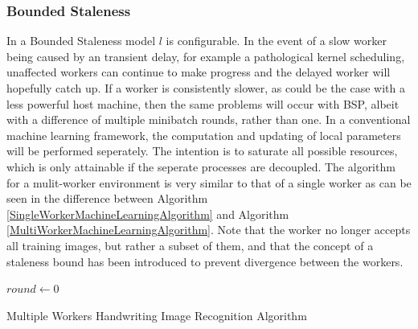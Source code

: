 \documentclass[12pt]{article}
\begin{document}
\subsubsection{Bounded Staleness}
In a Bounded Staleness model $l$ is configurable. In the event of a slow worker being caused by an transient delay, for example a pathological kernel scheduling, unaffected workers can continue to make progress and the delayed worker will hopefully catch up. If a worker is consistently slower, as could be the case with a less powerful host machine, then the same problems will occur with BSP, albeit with a difference of multiple minibatch rounds, rather than one.
\newline
\newline
In a conventional machine learning framework, the computation and updating of local parameters will be performed seperately. The intention is to saturate all possible resources, which is only attainable if the seperate processes are decoupled.
\newline
\newline
The algorithm for a mulit-worker environment is very similar to that of a single worker as can be seen in the difference between Algorithm \ref{SingleWorkerMachineLearningAlgorithm} and Algorithm \ref{MultiWorkerMachineLearningAlgorithm}. Note that the worker no longer accepts all training images, but rather a subset of them, and that the concept of a staleness bound has been introduced to prevent divergence between the workers.

\IncMargin{1em}
\begin{algorithm}[H]
 \BlankLine

 $round \longleftarrow 0$\;
 \caption{Multiple Workers Handwriting Image Recognition Algorithm}
 \label{MultiWorkerMachineLearningAlgorithm}
\end{algorithm}
\DecMargin{1em}
\end{document}

